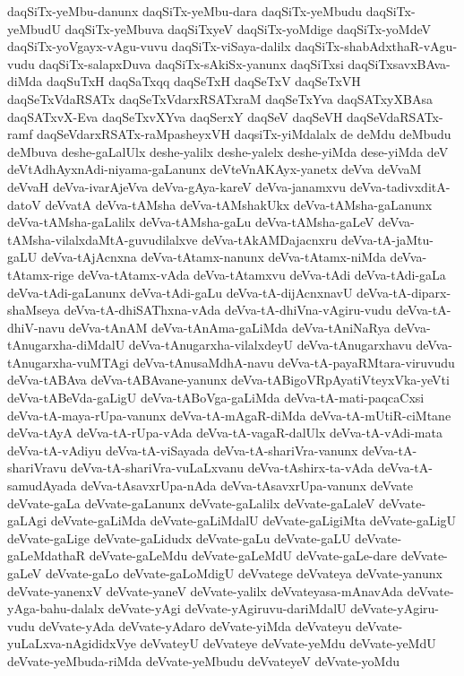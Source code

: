 {daqSiTx-yeMbu-danunx
daqSiTx-yeMbu-dara
daqSiTx-yeMbudu
daqSiTx-yeMbudU
daqSiTx-yeMbuva
daqSiTxyeV
daqSiTx-yoMdige
daqSiTx-yoMdeV
daqSiTx-yoVgayx-vAgu-vuvu
daqSiTx-viSaya-dalilx
daqSiTx-shabAdxthaR-vAgu-vudu
daqSiTx-salapxDuva
daqSiTx-sAkiSx-yanunx
daqSiTxsi
daqSiTxsavxBAva-diMda
daqSuTxH
daqSaTxqq
daqSeTxH
daqSeTxV
daqSeTxVH
daqSeTxVdaRSATx
daqSeTxVdarxRSATxraM
daqSeTxYva
daqSATxyXBAsa
daqSATxvX-Eva
daqSeTxvXYva
daqSerxY
daqSeV
daqSeVH
daqSeVdaRSATx-ramf
daqSeVdarxRSATx-raMpasheyxVH
daqsiTx-yiMdalalx
de
deMdu
deMbudu
deMbuva
deshe-gaLalUlx
deshe-yalilx
deshe-yalelx
deshe-yiMda
dese-yiMda
deV
deVtAdhAyxnAdi-niyama-gaLanunx
deVteVnAKAyx-yanetx
deVva
deVvaM
deVvaH
deVva-ivarAjeVva
deVva-gAya-kareV
deVva-janamxvu
deVva-tadivxditA-datoV
deVvatA
deVva-tAMsha
deVva-tAMshakUkx
deVva-tAMsha-gaLanunx
deVva-tAMsha-gaLalilx
deVva-tAMsha-gaLu
deVva-tAMsha-gaLeV
deVva-tAMsha-vilalxdaMtA-guvudilalxve
deVva-tAkAMDajacnxru
deVva-tA-jaMtu-gaLU
deVva-tAjAcnxna
deVva-tAtamx-nanunx
deVva-tAtamx-niMda
deVva-tAtamx-rige
deVva-tAtamx-vAda
deVva-tAtamxvu
deVva-tAdi
deVva-tAdi-gaLa
deVva-tAdi-gaLanunx
deVva-tAdi-gaLu
deVva-tA-dijAcnxnavU
deVva-tA-diparx-shaMseya
deVva-tA-dhiSAThxna-vAda
deVva-tA-dhiVna-vAgiru-vudu
deVva-tA-dhiV-navu
deVva-tAnAM
deVva-tAnAma-gaLiMda
deVva-tAniNaRya
deVva-tAnugarxha-diMdalU
deVva-tAnugarxha-vilalxdeyU
deVva-tAnugarxhavu
deVva-tAnugarxha-vuMTAgi
deVva-tAnusaMdhA-navu
deVva-tA-payaRMtara-viruvudu
deVva-tABAva
deVva-tABAvane-yanunx
deVva-tABigoVRpAyatiVteyxVka-yeVti
deVva-tABeVda-gaLigU
deVva-tABoVga-gaLiMda
deVva-tA-mati-paqcaCxsi
deVva-tA-maya-rUpa-vanunx
deVva-tA-mAgaR-diMda
deVva-tA-mUtiR-ciMtane
deVva-tAyA
deVva-tA-rUpa-vAda
deVva-tA-vagaR-dalUlx
deVva-tA-vAdi-mata
deVva-tA-vAdiyu
deVva-tA-viSayada
deVva-tA-shariVra-vanunx
deVva-tA-shariVravu
deVva-tA-shariVra-vuLaLxvanu
deVva-tAshirx-ta-vAda
deVva-tA-samudAyada
deVva-tAsavxrUpa-nAda
deVva-tAsavxrUpa-vanunx
deVvate
deVvate-gaLa
deVvate-gaLanunx
deVvate-gaLalilx
deVvate-gaLaleV
deVvate-gaLAgi
deVvate-gaLiMda
deVvate-gaLiMdalU
deVvate-gaLigiMta
deVvate-gaLigU
deVvate-gaLige
deVvate-gaLidudx
deVvate-gaLu
deVvate-gaLU
deVvate-gaLeMdathaR
deVvate-gaLeMdu
deVvate-gaLeMdU
deVvate-gaLe-dare
deVvate-gaLeV
deVvate-gaLo
deVvate-gaLoMdigU
deVvatege
deVvateya
deVvate-yanunx
deVvate-yanenxV
deVvate-yaneV
deVvate-yalilx
deVvateyasa-mAnavAda
deVvate-yAga-bahu-dalalx
deVvate-yAgi
deVvate-yAgiruvu-dariMdalU
deVvate-yAgiru-vudu
deVvate-yAda
deVvate-yAdaro
deVvate-yiMda
deVvateyu
deVvate-yuLaLxva-nAgididxVye
deVvateyU
deVvateye
deVvate-yeMdu
deVvate-yeMdU
deVvate-yeMbuda-riMda
deVvate-yeMbudu
deVvateyeV
deVvate-yoMdu
}
